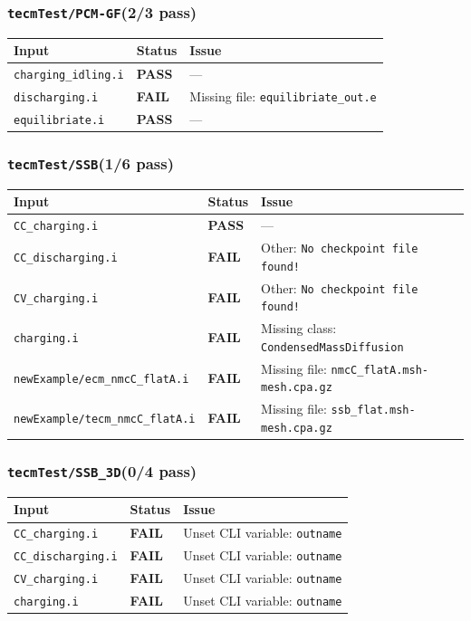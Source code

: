\documentclass[10pt,letterpaper]{article}
\newcommand{\PASS}{\textcolor{passgreen}{\textbf{PASS}}}
\newcommand{\FAIL}{\textcolor{failred}{\textbf{FAIL}}}
\newcommand{\code}[1]{\texttt{\small #1}}
\begin{document}
\subsubsection{\code{tecmTest/PCM-GF}\hfill (2/3 pass)}
\begin{longtable}{p{} l p{}}
\toprule
Input & Status & Issue \\
\midrule
\endhead
\code{charging\_idling.i} & \PASS & --- \\
\code{discharging.i} & \FAIL & Missing file: \code{equilibriate\_out.e} \\
\code{equilibriate.i} & \PASS & --- \\
\bottomrule
\end{longtable}

\subsubsection{\code{tecmTest/SSB}\hfill (1/6 pass)}
\begin{longtable}{p{} l p{}}
\toprule
Input & Status & Issue \\
\midrule
\endhead
\code{CC\_charging.i} & \PASS & --- \\
\code{CC\_discharging.i} & \FAIL & Other: \code{No checkpoint file found!} \\
\code{CV\_charging.i} & \FAIL & Other: \code{No checkpoint file found!} \\
\code{charging.i} & \FAIL & Missing class: \code{CondensedMassDiffusion} \\
\code{newExample/ecm\_nmcC\_flatA.i} & \FAIL & Missing file: \code{nmcC\_flatA.msh-mesh.cpa.gz} \\
\code{newExample/tecm\_nmcC\_flatA.i} & \FAIL & Missing file: \code{ssb\_flat.msh-mesh.cpa.gz} \\
\bottomrule
\end{longtable}

\subsubsection{\code{tecmTest/SSB\_3D}\hfill (0/4 pass)}
\begin{longtable}{p{} l p{}}
\toprule
Input & Status & Issue \\
\midrule
\endhead
\code{CC\_charging.i} & \FAIL & Unset CLI variable: \code{outname} \\
\code{CC\_discharging.i} & \FAIL & Unset CLI variable: \code{outname} \\
\code{CV\_charging.i} & \FAIL & Unset CLI variable: \code{outname} \\
\code{charging.i} & \FAIL & Unset CLI variable: \code{outname} \\
\bottomrule
\end{longtable}
\end{document}
